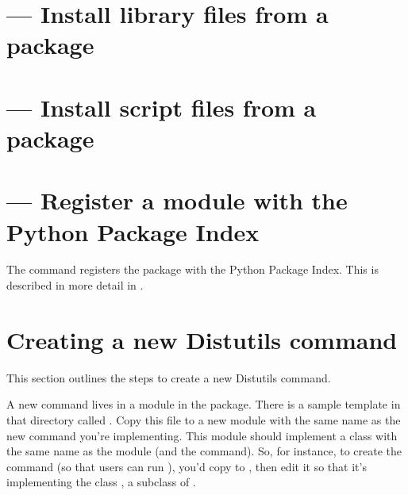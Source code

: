 \documentclass{manual}
\begin{document}

\section{
               --- Install library files from a package}


\section{
               --- Install script files from a package}


\section{
               --- Register a module with the Python Package Index}

The  command registers the package with the Python Package 
Index.  This is described in more detail in .

\section{Creating a new Distutils command}

This section outlines the steps to create a new Distutils command.

A new command lives in a module in the 
package. There is a sample template in that directory called 
. Copy this file to a new module with the
same name as the new command you're implementing. This module should
implement a class with the same name as the module (and the command).
So, for instance, to create the command  (so that users
can run ), you'd copy  
to , then edit it so that it's
implementing the class , a subclass of 
.
\end{document}
